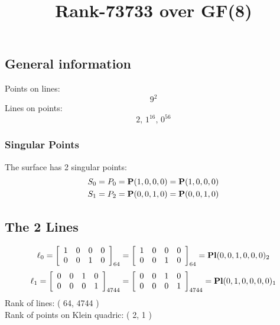 \documentclass{article}
\newcommand\setTBstruts{\def\T{\rule{0pt}{2.6ex}}%
\def\B{\rule[-1.2ex]{0pt}{0pt}}}
\newcommand{\bP}{{\bf P}}
\begin{document}
 
\setTBstruts



{\allowdisplaybreaks%






\title{Rank-73733 over GF(8)}
\author{}%
\maketitle%
%
{}



\subsection*{General information}
Points on lines:
$$
9^2$$
Lines on points:
$$
2,\,1^{16},\,0^{56}$$
\subsubsection*{Singular Points}
The surface has 2 singular points:\\
\begin{align*}
S_{0} &= P_{0}=\bP(1, 0, 0, 0) = \bP(1, 0, 0, 0)\\
S_{1} &= P_{2}=\bP(0, 0, 1, 0) = \bP(0, 0, 1, 0)\\
\end{align*}
\subsection*{The 2 Lines}
$$
\ell_{0} = 
\left[
\begin{array}{*{4}{r}}
1 & 0 & 0 & 0\\
0 & 0 & 1 & 0\\
\end{array}
\right]
_{64}
=
\left[
\begin{array}{*{4}c}
1  & 0  & 0  & 0\\
0  & 0  & 1  & 0\\
\end{array}
\right]_{64}
={\rm\bf Pl}(0,0,1,0,0,0 )_{2}$$
$$
\ell_{1} = 
\left[
\begin{array}{*{4}{r}}
0 & 0 & 1 & 0\\
0 & 0 & 0 & 1\\
\end{array}
\right]
_{4744}
=
\left[
\begin{array}{*{4}c}
0  & 0  & 1  & 0\\
0  & 0  & 0  & 1\\
\end{array}
\right]_{4744}
={\rm\bf Pl}(0,1,0,0,0,0 )_{1}$$
Rank of lines: ( 64, 4744 )\\
Rank of points on Klein quadric: ( 2, 1 )\\
}
\end{document}
